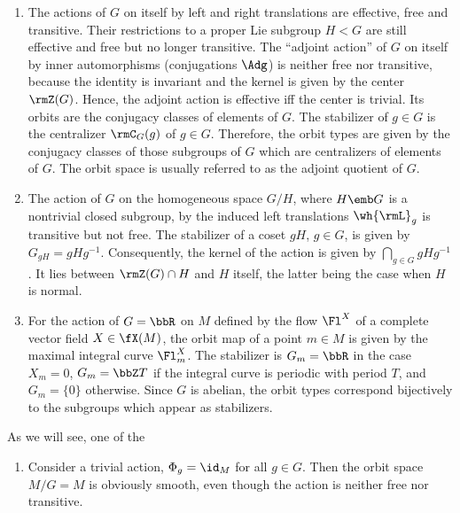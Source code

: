 \begin{example}
\begin{enumerate}
    \item  The actions of $G$ on itself by left and right translations are effective, free and transitive. Their restrictions to a proper Lie subgroup $H< G$ are still effective and free but no longer transitive. The ``adjoint action'' of $G$ on itself by inner automorphisms (conjugations $\Adg$) is neither free nor transitive, because the identity is invariant and the kernel is given by the center $\rmZ(G)$. Hence, the adjoint action is effective iff the center is trivial. Its orbits are the conjugacy classes of elements of $G$. The stabilizer of $g\in G$ is the centralizer  $\rmC_G(g)$ of $g\in G$. Therefore, the orbit types are given by the conjugacy classes of those subgroups of $G$ which are centralizers of elements of $G$. The orbit space is usually referred to as the adjoint quotient of $G$.
    \item The action of $G$ on the homogeneous space $G\slash H$, where $H\emb G$ is a nontrivial closed subgroup, by the induced left translations $\wh{\rmL}_g$ is transitive but not free. The stabilizer of a coset $gH$, $g\in G$, is given by $G_{gH}=gHg^{-1}$. Consequently, the kernel of the action is given by $\bigcap_{g\in G}gHg^{-1}$. It lies between $\rmZ(G)\cap H$ and $H$ itself, the latter being the case when $H$ is normal.
    \item For the action of $G=\bbR$ on $M$ defined by the flow $\Fl^X$ of a complete vector field $X\in\fX(M)$, the orbit map of a point $m\in M$ is given by the maximal integral curve $\Fl^X_m$. The stabilizer is $G_m=\bbR$ in the case $X_m=0$, $G_m=\bbZ T$ if the integral curve is periodic with period $T$, and $G_m=\{0\}$ otherwise. Since $G$ is abelian, the orbit types correspond bijectively to the subgroups which appear as stabilizers.
\end{enumerate}
\end{example}

\begin{example}
    As we will see, one of the 
    \begin{enumerate}
        \item Consider a trivial action, $\Phi_g=\id_M$ for all $g\in G$. Then the orbit space $M\slash G=M$ is obviously smooth, even though the action is neither free nor transitive.
    \end{enumerate}
\end{example}




